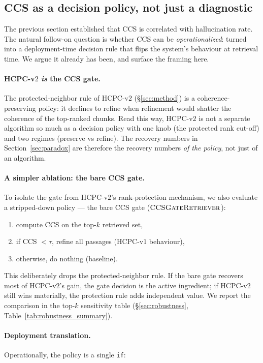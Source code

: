 \subsection{CCS as a decision policy, not just a diagnostic}
\label{sec:ccs_policy}

The previous section established that CCS is correlated with
hallucination rate. The natural follow-on question is whether CCS can
be \emph{operationalized}: turned into a deployment-time decision rule
that flips the system's behaviour at retrieval time.  We argue it
already has been, and surface the framing here.

\paragraph{HCPC-v$2$ \emph{is} the CCS gate.}
The protected-neighbor rule of HCPC-v$2$
(\S\ref{sec:method}) is a coherence-preserving policy: it declines to
refine when refinement would shatter the coherence of the top-ranked
chunks. Read this way, HCPC-v$2$ is not a separate algorithm so much
as a decision policy with one knob (the protected rank cut-off) and
two regimes (preserve vs refine). The recovery numbers in
Section~\ref{sec:paradox} are therefore the recovery numbers
\emph{of the policy}, not just of an algorithm.

\paragraph{A simpler ablation: the bare CCS gate.}
To isolate the gate from HCPC-v$2$'s rank-protection mechanism, we
also evaluate a stripped-down policy --- the bare CCS gate
($\textsc{CCSGateRetriever}$):
\begin{enumerate}
  \item compute CCS on the top-$k$ retrieved set,
  \item if CCS $< \tau$, refine all passages (HCPC-v$1$ behaviour),
  \item otherwise, do nothing (baseline).
\end{enumerate}
This deliberately drops the protected-neighbor rule. If the bare gate
recovers most of HCPC-v$2$'s gain, the gate decision is the active
ingredient; if HCPC-v$2$ still wins materially, the protection rule
adds independent value. We report the comparison in the top-$k$
sensitivity table (\S\ref{sec:robustness}, Table~\ref{tab:robustness_summary}).

\paragraph{Deployment translation.}
Operationally, the policy is a single \texttt{if}:

